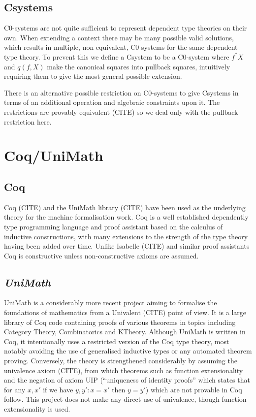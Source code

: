 \subsection{Csystems}
C0-systems are not quite sufficient to represent dependent type theories on
their own. When extending a context there may be many possible valid solutions,
which results in multiple, non-equivalent, C0-systems for the same dependent
type theory. To prevent this we define a Csystem to be a C0-system where $f^*X$
and $q(f, X)$ make the canonical squares into pullback squares, intuitively
requiring them to give the most general possible extension.

There is an alternative possible restriction on C0-systems to give Csystems in
terms of an additional operation and algebraic constraints upon it. The
restrictions are provably equivalent (CITE) so we deal only with the pullback
restriction here.

\section{Coq/UniMath}
\subsection{Coq}
Coq (CITE) and the UniMath library (CITE) have been used as the underlying
theory for the machine formalisation work. Coq is a well established dependently
type programming language and proof assistant based on the calculus of inductive
constructions, with many extensions to the strength of the type theory having
been added over time. Unlike Isabelle (CITE) and similar proof assistants Coq is
constructive unless non-constructive axioms are assumed. 

\subsection{\textit{UniMath}}
UniMath is a considerably more recent project aiming to formalise the
foundations of mathematics from a Univalent (CITE) point of view. It is a large
library of Coq code containing proofs of various theorems in topics including
Category Theory, Combinatorics and KTheory. Although UniMath is written in Coq,
it intentionally uses a restricted version of the Coq type theory, most notably
avoiding the use of generalised inductive types or any automated theorem
proving. Conversely, the theory is strengthened considerably by assuming the
univalence axiom (CITE), from which theorems such as function extensionality and
the negation of axiom UIP (``uniqueness of identity proofs'' which states that
for any $x, x'$ if we have $y, y' : x=x'$ then $y=y'$) which are not provable in
Coq follow. This project does not make any direct use of univalence, though
function extensionality is used.

